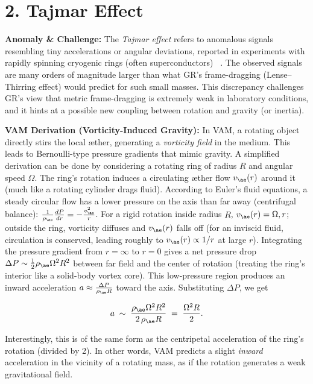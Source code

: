 \documentclass[a4paper, aps,preprint,superscriptaddress, 12pt]{revtex4}
\begin{document}
\section*{2. Tajmar Effect}

\textbf{Anomaly \& Challenge: } The \textit{Tajmar effect} refers to anomalous signals resembling tiny accelerations or angular deviations, reported in experiments with rapidly spinning cryogenic rings (often superconductors)~\cite{Iskandarani2025b} . The observed signals are many orders of magnitude larger than what GR's frame-dragging (Lense–Thirring effect) would predict for such small masses. This discrepancy challenges GR's view that metric frame-dragging is extremely weak in laboratory conditions, and it hints at a possible new coupling between rotation and gravity (or inertia).


\textbf{VAM Derivation (Vorticity-Induced Gravity):} In VAM, a rotating object directly stirs the local æther, generating a \textit{vorticity field} in the medium. This leads to Bernoulli-type pressure gradients that mimic gravity. A simplified derivation can be done by considering a rotating ring of radius $R$ and angular speed $\Omega$. The ring's rotation induces a circulating æther flow $v_{\ae}(r)$ around it (much like a rotating cylinder drags fluid). According to Euler's fluid equations, a steady circular flow has a lower pressure on the axis than far away (centrifugal balance): $\frac{1}{\rho_{\ae}}\frac{dP}{dr} = -\frac{v_{\ae}^2}{r}$. For a rigid rotation inside radius $R$, $v_{\ae}(r)=\Omega,r$; outside the ring, vorticity diffuses and $v_{\ae}(r)$ falls off (for an inviscid fluid, circulation is conserved, leading roughly to $v_{\ae}(r)\propto 1/r$ at large $r$). Integrating the pressure gradient from $r=\infty$ to $r=0$ gives a net pressure drop $\Delta P \sim \frac{1}{2}\rho_{\ae}\Omega^2 R^2$ between far field and the center of rotation (treating the ring's interior like a solid-body vortex core). This low-pressure region produces an inward acceleration $a \approx \frac{\Delta P}{\rho_{\ae}R}$ toward the axis. Substituting $\Delta P$, we get

\begin{equation}
    a \;\sim\; \frac{\rho_{\ae}\Omega^2 R^2}{2\,\rho_{\ae}R} \;=\; \frac{\Omega^2 R}{2}.
\end{equation}

Interestingly, this is of the same form as the centripetal acceleration of the ring's rotation (divided by 2). In other words, VAM predicts a slight \textit{inward} acceleration in the vicinity of a rotating mass, as if the rotation generates a weak gravitational field.
\end{document}
